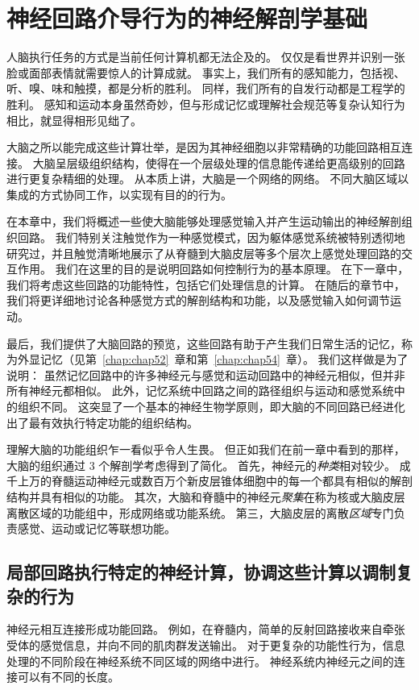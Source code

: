 \chapter{神经回路介导行为的神经解剖学基础} \label{chap:chap4}

人脑执行任务的方式是当前任何计算机都无法企及的。
仅仅是看世界并识别一张脸或面部表情就需要惊人的计算成就。
事实上，我们所有的感知能力，包括视、听、嗅、味和触摸，都是分析的胜利。
同样，我们所有的自发行动都是工程学的胜利。
感知和运动本身虽然奇妙，但与形成记忆或理解社会规范等复杂认知行为相比，就显得相形见绌了。


大脑之所以能完成这些计算壮举，是因为其神经细胞以非常精确的功能回路相互连接。
大脑呈层级组织结构，使得在一个层级处理的信息能传递给更高级别的回路进行更复杂精细的处理。 
从本质上讲，大脑是一个网络的网络。 
不同大脑区域以集成的方式协同工作，以实现有目的的行为。


在本章中，我们将概述一些使大脑能够处理感觉输入并产生运动输出的神经解剖组织回路。
我们特别关注触觉作为一种感觉模式，因为躯体感觉系统被特别透彻地研究过，并且触觉清晰地展示了从脊髓到大脑皮层等多个层次上感觉处理回路的交互作用。
我们在这里的目的是说明回路如何控制行为的基本原理。 
在下一章中，我们将考虑这些回路的功能特性，包括它们处理信息的计算。 
在随后的章节中，我们将更详细地讨论各种感觉方式的解剖结构和功能，以及感觉输入如何调节运动。


最后，我们提供了大脑回路的预览，这些回路有助于产生我们日常生活的记忆，称为外显记忆（见第~\ref{chap:chap52}~章和第~\ref{chap:chap54}~章）。
我们这样做是为了说明：
虽然记忆回路中的许多神经元与感觉和运动回路中的神经元相似，但并非所有神经元都相似。
此外，记忆系统中回路之间的路径组织与运动和感觉系统中的组织不同。
这突显了一个基本的神经生物学原则，即大脑的不同回路已经进化出了最有效执行特定功能的组织结构。


理解大脑的功能组织乍一看似乎令人生畏。 
但正如我们在前一章中看到的那样，大脑的组织通过 3 个解剖学考虑得到了简化。
首先，神经元的\textit{种类}相对较少。
成千上万的脊髓运动神经元或数百万个新皮层锥体细胞中的每一个都具有相似的解剖结构并具有相似的功能。 
其次，大脑和脊髓中的神经元\textit{聚集}在称为核或大脑皮层离散区域的功能组中，形成网络或功能系统。 
第三，大脑皮层的离散\textit{区域}专门负责感觉、运动或记忆等联想功能。


\section{局部回路执行特定的神经计算，协调这些计算以调制复杂的行为}

神经元相互连接形成功能回路。 
例如，在脊髓内，简单的反射回路接收来自牵张受体的感觉信息，并向不同的肌肉群发送输出。
对于更复杂的功能性行为，信息处理的不同阶段在神经系统不同区域的网络中进行。
神经系统内神经元之间的连接可以有不同的长度。


